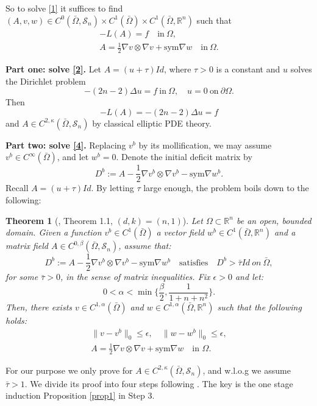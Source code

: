 \documentclass[reqno,12pt]{amsart}
\numberwithin{equation}{section}
\theoremstyle{plain}
\newtheorem{thm}{Theorem}[section]
\theoremstyle{definition}
\newcommand{\R}{\mathbb{R}}
\renewcommand{\S}{{\mathcal{S}_n}}
\newcommand{\sym}{\text{sym}}
\begin{document}
So to solve \eqref{1} it suffices to find $(A,v,w)\in C^0(\bar\Omega,\S)\times C^1(\bar\Omega)\times C^1(\bar\Omega, \R^n)$ such that
\begin{align}
    -L(A)=f\quad\text{in}\ \Omega, \label{2}\\
    A=\frac{1}{2}\nabla v\otimes\nabla v+\sym\nabla w\quad\text{in}\ \Omega.\label{4}
\end{align}

\textbf{Part one: solve \eqref{2}.}
Let $A=(u+\tau)Id$, where $\tau>0$ is a constant and $u$ solves the Dirichlet problem
\begin{equation*}
-(2n-2)\Delta u =f\ \text{in}\ \Omega,\quad u=0\ \text{on}\ \partial\Omega.
\end{equation*}
Then
\begin{equation*}
    -L(A)=-(2n-2)\Delta u=f
\end{equation*}
and $A\in C^{2,\kappa}(\bar\Omega,\S)$ by classical elliptic PDE theory.

\textbf{Part two: solve \eqref{4}.}
Replacing $v^b$ by its mollification, we may assume $v^b\in C^\infty(\bar\Omega)$, and let $w^b=0$. Denote the initial deficit matrix by
\begin{equation}\label{901}
D^b:=A-\frac{1}{2}\nabla v^b\otimes\nabla v^b-\sym\nabla w^b.
\end{equation}
Recall $A=(u+\tau)Id$. By letting $\tau$ large enough, the problem boils down to the following:
\begin{thm}[\cite{lewicka22monge}, Theorem 1.1, $(d,k)=(n,1)$]\label{thm1}
Let $\Omega\subset\mathbb R^n$ be an open, bounded domain. Given a function $v^b\in C^1(\bar\Omega)$ a vector field $w^b\in C^1(\bar\Omega, \mathbb R^n)$ and a matrix field $A\in C^{0,\beta}(\bar\Omega, \S)$, assume that: 
\begin{equation}\label{902}
D^b:=A-\frac{1}{2}\nabla v^b\otimes\nabla v^b-\sym\nabla w^b\quad \text{satisfies}\quad D^b>\bar \tau Id\ on\ \bar\Omega,
\end{equation} 
for some $\bar \tau>0$, in the sense of matrix inequalities. Fix $\epsilon>0$ and let: 
\begin{equation*}
0< \alpha < \min\{\frac{\beta}{2},\frac{1}{1+n+n^2}\}.
\end{equation*} 
Then, there exists $v\in C^{1,\alpha}(\bar\Omega)$ and $w\in C^{1,\alpha}(\bar\Omega,\R^n)$ such that the following holds: \begin{gather}
    \|v-v^b\|_0\le\epsilon,\quad \|w-w^b\|_0\le\epsilon, \label{thm1.1}\\
    A=\frac{1}{2}\nabla v\otimes\nabla v+\sym\nabla w\quad \text{in }\Omega. \label{thm1.2}
\end{gather}
\end{thm}
 For our purpose we only prove for $A\in C^{2,\kappa}(\bar\Omega,\S)$, and w.l.o.g we assume  $\bar\tau>1$. We divide its proof into four steps following \cite{cao19very}. The key is the one stage induction Proposition \ref{prop1} in Step 3.
 
\end{document}

